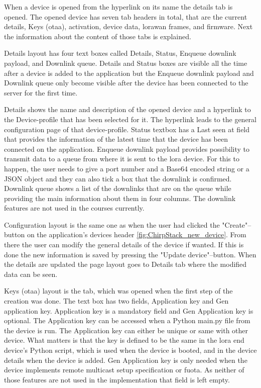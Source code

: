 When a device is opened from the hyperlink on its name the details tab is opened.
The opened device has seven tab headers in total, that are the current details, Keys (\gls{otaa}), activation, device data, \gls{lorawan} frames, and firmware.
Next the information about the content of those tabs is explained.

Details layout has four text boxes called Details, Status, Enqueue downlink payload, and Downlink queue.
Details and Status boxes are visible all the time after a device is added to the application but the Enqueue downlink payload and Downlink queue only become visible after the device has been connected to the server for the first time.

Details shows the name and description of the opened device and a hyperlink to the Device-profile that has been selected for it.
The hyperlink leads to the general configuration page of that device-profile.
Status textbox has a Last seen at field that provides the information of the latest time that the device has been connected on the application.
Enqueue downlink payload provides possibility to transmit data to a queue from where it is sent to the \gls{lora} device. For this to happen, the user needs to give a port number and a Base64 encoded string or a JSON object and they can also tick a box  that the downlink is confirmed.
Downlink queue shows  a list of the downlinks that are on the queue while providing the main information about them in four columns.
The downlink features are not used in the courses currently.

Configuration layout is the same one as when the user had clicked the "Create"--button on the application's devices header \ref{fig:ChirpStack_new_device}.
From there the user can modify the general details of the device if wanted.
If this is done the new information is saved by pressing the "Update device"--button.
When the details are updated the page layout goes to Details tab where the modified data can be seen.

Keys (\gls{otaa}) layout is the tab, which was opened when the first step of the creation was done.
The text box has two fields, Application key and Gen application key.
Application key is a mandatory field and Gen Application key is optional.
The Application key can be accessed when a Python main.py file from the device is run.
The Application key can either be unique or same with other device.
What matters is that the key is defined to be the same in the \gls{lora} end device's Python script, which is used when the device is booted, and in the device details when the device is added.
Gen Application key is only needed when the device implements remote multicast setup specification or \gls{fuota}.
As neither of those features are not used in the implementation that field is left empty.

